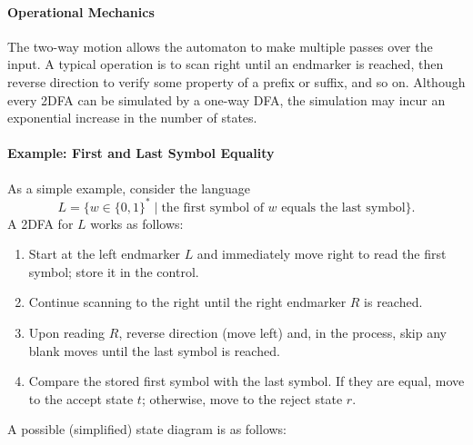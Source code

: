 \paragraph{Operational Mechanics}
The two-way motion allows the automaton to make multiple passes over the input. A typical operation is to scan right until an endmarker is reached, then reverse direction to verify some property of a prefix or suffix, and so on. Although every 2DFA can be simulated by a one-way DFA, the simulation may incur an exponential increase in the number of states.

\paragraph{Example: First and Last Symbol Equality}
As a simple example, consider the language 
\[
L = \{ w\in \{0,1\}^* \mid \text{the first symbol of } w \text{ equals the last symbol} \}.
\]
A 2DFA for \(L\) works as follows:
\begin{enumerate}
  \item Start at the left endmarker \(L\) and immediately move right to read the first symbol; store it in the control.
  \item Continue scanning to the right until the right endmarker \(R\) is reached.
  \item Upon reading \(R\), reverse direction (move left) and, in the process, skip any blank moves until the last symbol is reached.
  \item Compare the stored first symbol with the last symbol. If they are equal, move to the accept state \(t\); otherwise, move to the reject state \(r\).
\end{enumerate}
A possible (simplified) state diagram is as follows:

\begin{center}
\end{center}

